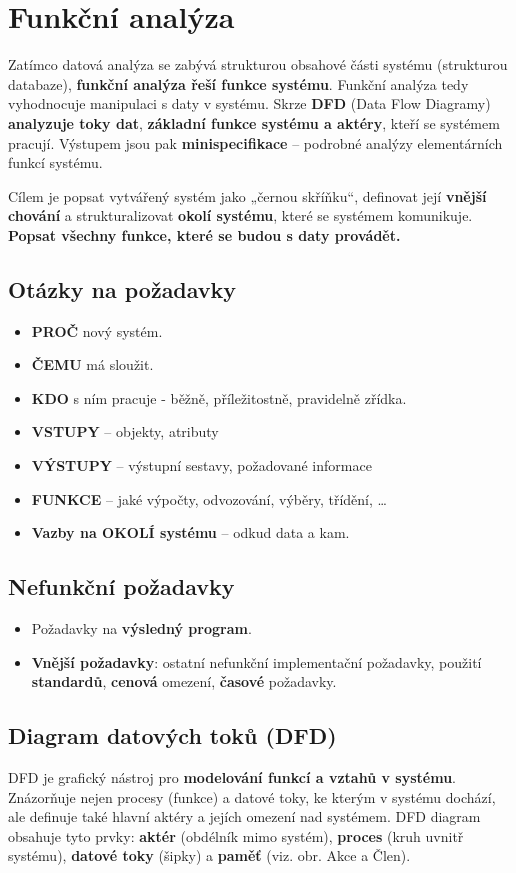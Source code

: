 \section{Funkční analýza}
Zatímco datová analýza se zabývá strukturou obsahové části systému (strukturou databaze), \textbf{funkční analýza řeší funkce systému}. Funkční analýza tedy vyhodnocuje manipulaci s daty v systému. Skrze \textbf{DFD} (Data Flow Diagramy) \textbf{analyzuje toky dat}, \textbf{základní funkce systému a aktéry}, kteří se systémem pracují. Výstupem jsou pak \textbf{minispecifikace} -- podrobné analýzy elementárních funkcí systému.

Cílem je popsat vytvářený systém jako „černou skříňku“, definovat její \textbf{vnější chování} a strukturalizovat \textbf{okolí systému}, které se systémem komunikuje. \textbf{Popsat všechny funkce, které se budou s daty provádět.}

\subsection*{Otázky na požadavky}
\begin{itemize}
    \item\textbf{PROČ} nový systém.
    \item\textbf{ČEMU} má sloužit.
    \item\textbf{KDO} s ním pracuje - běžně, příležitostně, pravidelně zřídka.
    \item\textbf{VSTUPY} – objekty, atributy
    \item\textbf{VÝSTUPY} – výstupní sestavy, požadované informace
    \item\textbf{FUNKCE} – jaké výpočty, odvozování, výběry, třídění, \ldots
    \item\textbf{Vazby na OKOLÍ systému} – odkud data a kam.
\end{itemize}

\subsection*{Nefunkční požadavky}
\begin{itemize}
    \item Požadavky na \textbf{výsledný program}.
    \item \textbf{Vnější požadavky}: ostatní nefunkční implementační požadavky, použití \textbf{standardů}, \textbf{cenová} omezení, \textbf{časové} požadavky.
\end{itemize}

\subsection{Diagram datových toků (DFD)}
DFD je grafický nástroj pro \textbf{modelování funkcí a vztahů v systému}. Znázorňuje nejen procesy (funkce) a datové toky, ke kterým v systému dochází, ale definuje také hlavní aktéry a jejích omezení nad systémem. DFD diagram obsahuje tyto prvky: \textbf{aktér} (obdélník mimo systém), \textbf{proces} (kruh uvnitř systému), \textbf{datové toky} (šipky) a \textbf{paměť} (viz. obr. Akce a Člen).

